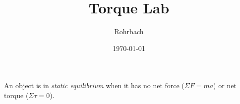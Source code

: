 \documentclass[10pt]{exam}
\title{Torque Lab}
\author{Rohrbach}
\date{\today}
\begin{document}
\maketitle

An object is in \emph{static equilibrium} when it has no net force ($\Sigma F=ma$) or net torque ($\Sigma \tau =0$).
\end{document}
